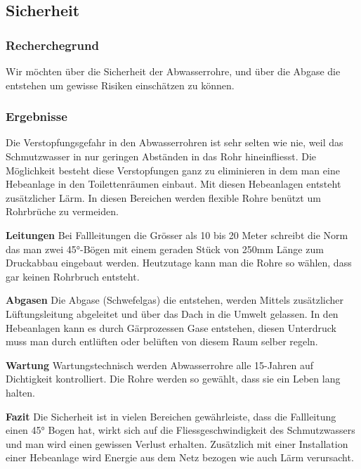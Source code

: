 \subsection{Sicherheit}


\subsubsection{Recherchegrund}
Wir möchten über die Sicherheit der Abwasserrohre, und über die Abgase die entstehen um gewisse Risiken einschätzen zu können. 

\subsubsection{Ergebnisse}

Die Verstopfungsgefahr in den Abwasserrohren ist sehr selten wie nie, weil das Schmutzwasser in nur geringen Abständen in das Rohr hineinfliesst. Die Möglichkeit besteht diese Verstopfungen ganz zu eliminieren in dem man eine Hebeanlage in den Toilettenräumen einbaut. Mit diesen Hebeanlagen entsteht zusätzlicher Lärm. In diesen Bereichen werden flexible Rohre benützt um Rohrbrüche zu vermeiden.

\textbf{Leitungen}
Bei Fallleitungen die Grösser als 10 bis 20 Meter schreibt die Norm das man zwei 45°-Bögen mit einem geraden Stück von 250mm Länge zum Druckabbau eingebaut werden. Heutzutage kann man die Rohre so wählen, dass gar keinen Rohrbruch entsteht.

\textbf{Abgasen}
Die Abgase (Schwefelgas) die entstehen, werden Mittels zusätzlicher Lüftungsleitung abgeleitet und über das Dach in die Umwelt gelassen. In den Hebeanlagen kann es durch Gärprozessen Gase entstehen, diesen Unterdruck muss man durch entlüften oder belüften von diesem Raum selber regeln. 

\textbf{Wartung}
Wartungstechnisch werden Abwasserrohre alle 15-Jahren auf Dichtigkeit kontrolliert. Die Rohre werden so gewählt, dass sie ein Leben lang halten.

\textbf{Fazit}
Die Sicherheit ist in vielen Bereichen gewährleiste, dass die Fallleitung einen 45° Bogen hat, wirkt sich auf die Fliessgeschwindigkeit des Schmutzwassers und man wird einen gewissen Verlust erhalten. Zusätzlich mit einer Installation einer Hebeanlage wird Energie aus dem Netz bezogen wie auch Lärm verursacht.

\clearpage 






